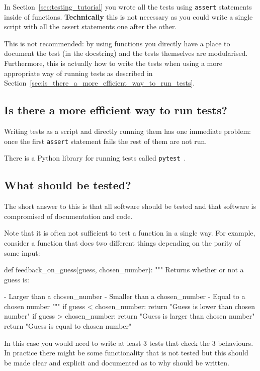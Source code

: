 In Section~\ref{sec:testing_tutorial} you wrote all the tests using
\texttt{assert} statements inside of functions. \textbf{Technically} this is not
necessary as you could write a single script with all the assert statements one
after the other.

This is not recommended: by using functions you directly have a place to document
the test (in the docstring) and the tests themselves are modularised.
Furthermore, this is actually how to write the tests when using a more
appropriate way of running tests as described in
Section~\ref{sec:is_there_a_more_efficient_way_to_run_tests}.


\subsection{Is there a more efficient way to run tests?}

Writing tests as a script and directly running them has one immediate problem:
once the first \texttt{assert} statement fails the rest of them are not run.


There is a Python library for running tests called
\texttt{pytest}~\cite{oliveira2018pytest}.

\subsection{What should be tested?}

The short answer to this is that all software should be tested and that software
is compromised of documentation and code.


Note that it is often not sufficient to test a function in a single way. For
example, consider a function that does two different things depending on the
parity of some input:

\begin{python}
def feedback_on_guess(guess, chosen_number):
    """
    Returns whether or not a guess is:

    - Larger than  a chosen_number
    - Smaller than a chosen_number
    - Equal to a chosen number
    """
    if guess < chosen_number:
        return "Guess is lower than chosen number"
    if guess > chosen_number:
        return "Guess is larger than chosen number"
    return "Guess is equal to chosen number"
\end{python}

In this case you would need to write at least 3 tests that check the 3
behaviours.
In practice there might be some functionality that is not tested but this should
be made clear and explicit and documented as to why should be written.


